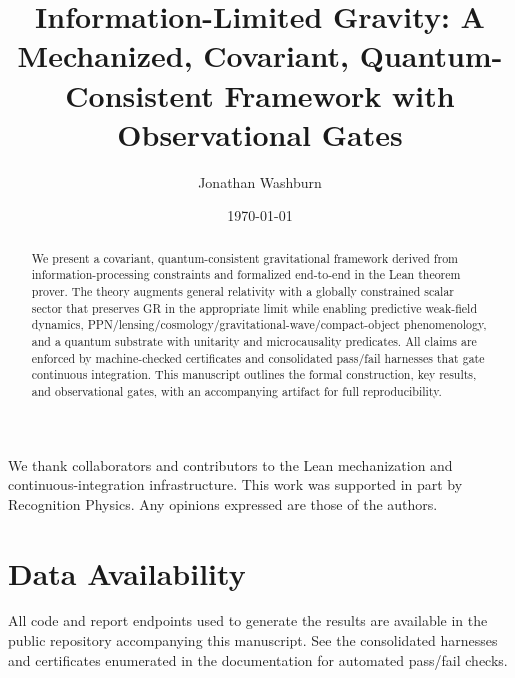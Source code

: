 \documentclass[aps,prd,twocolumn,superscriptaddress,nofootinbib,floatfix,longbibliography]{revtex4-2}
\begin{document}
\title{Information-Limited Gravity: A Mechanized, Covariant, Quantum-Consistent Framework with Observational Gates}

\author{Jonathan Washburn}


\date{\today}

\begin{abstract}
We present a covariant, quantum-consistent gravitational framework derived from information-processing constraints and formalized end-to-end in the Lean theorem prover. The theory augments general relativity with a globally constrained scalar sector that preserves GR in the appropriate limit while enabling predictive weak-field dynamics, PPN/lensing/cosmology/gravitational-wave/compact-object phenomenology, and a quantum substrate with unitarity and microcausality predicates. All claims are enforced by machine-checked certificates and consolidated pass/fail harnesses that gate continuous integration. This manuscript outlines the formal construction, key results, and observational gates, with an accompanying artifact for full reproducibility.
\end{abstract}

\maketitle


% 
% 
% 
% 
% 
% 
% 
% 
% 
% 
% 
% 

\begin{acknowledgments}
We thank collaborators and contributors to the Lean mechanization and continuous-integration infrastructure. This work was supported in part by Recognition Physics. Any opinions expressed are those of the authors.
\end{acknowledgments}

\section*{Data Availability}
All code and report endpoints used to generate the results are available in the public repository accompanying this manuscript. See the consolidated harnesses and certificates enumerated in the documentation for automated pass/fail checks.
\end{document}
